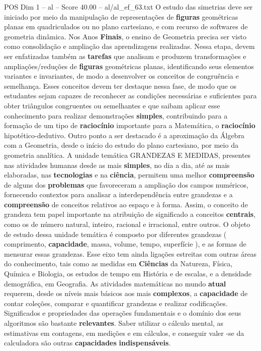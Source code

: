 \begin{textsample}{POS Dim 1 – al – Score 40.00 – al/al\_ef\_63.txt}
O estudo das simetrias deve ser iniciado por meio da manipulação de representações de \textbf{figuras} geométricas planas em quadriculados ou no plano cartesiano, e com recurso de softwares de geometria dinâmica.
Nos Anos \textbf{Finais}, o ensino de Geometria precisa ser visto como consolidação e ampliação das aprendizagens realizadas.
Nessa etapa, devem ser enfatizadas também as \textbf{tarefas} que analisam e produzem transformações e ampliações/reduções de \textbf{figuras} geométricas planas, identificando seus elementos variantes e invariantes, de modo a desenvolver os conceitos de congruência e semelhança.
Esses conceitos devem ter destaque nessa fase, de modo que os estudantes sejam capazes de reconhecer as condições necessárias e suficientes para obter triângulos congruentes ou semelhantes e que saibam aplicar esse conhecimento para realizar demonstrações \textbf{simples}, contribuindo para a formação de um tipo de \textbf{raciocínio} importante para a Matemática, o \textbf{raciocínio} hipotético-dedutivo.
Outro ponto a ser destacado é a aproximação da Álgebra com a Geometria, desde o início do estudo do plano cartesiano, por meio da geometria analítica.
A unidade temática GRANDEZAS E MEDIDAS, presentes nas atividades humanas desde as mais \textbf{simples}, no dia a dia, até as mais elaboradas, nas \textbf{tecnologias} e na \textbf{ciência}, permitem uma melhor \textbf{compreensão} de alguns dos \textbf{problemas} que favoreceram a ampliação dos campos numéricos, fornecendo contextos para analisar a interdependência entre grandezas e a \textbf{compreensão} de conceitos relativos ao espaço e à forma.
Assim, o conceito de grandeza tem papel importante na atribuição de significado a conceitos \textbf{centrais}, como os de número natural, inteiro, racional e irracional, entre outros.
O objeto de estudo dessa unidade temática é composto por diferentes grandezas ( comprimento, \textbf{capacidade}, massa, volume, tempo, superfície ), e as formas de mensurar essas grandezas.
Esse eixo tem ainda ligações estreitas com outras áreas do conhecimento, tais como as medidas em \textbf{Ciências} da Natureza, Física, Química e Biologia, os estudos de tempo em História e de escalas, e a densidade demográfica, em Geografia.
As atividades matemáticas no mundo \textbf{atual} requerem, desde os níveis mais básicos aos mais \textbf{complexos}, a \textbf{capacidade} de contar coleções, comparar e quantificar grandezas e realizar codificações.
Significados e propriedades das operações fundamentais e o domínio dos seus algoritmos são bastante \textbf{relevantes}.
Saber utilizar o cálculo mental, as estimativas em contagens, em medições e em cálculos, e conseguir valer -se da calculadora são outras \textbf{capacidades} \textbf{indispensáveis}.

\end{textsample}
